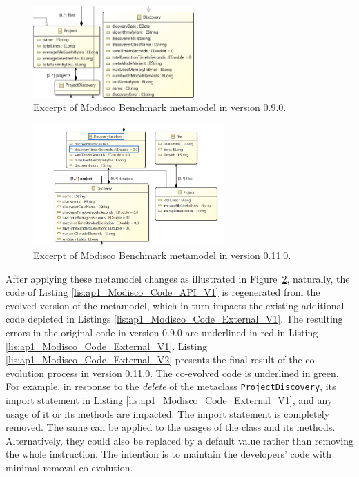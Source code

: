 \begin{figure}[t]
	
	\centering
	\includegraphics[width=0.55\textwidth]{./pics/chapter1pics/example.PNG}
	\caption{Excerpt of Modisco Benchmark metamodel in version 0.9.0.}
	\label{fig: BMM}
	\vspace{-5mm}
\end{figure}
\begin{figure}[t]
	
	\centering
	\includegraphics[width=0.65\textwidth]{./pics/chapter1pics/ExcerptModiscoV2.PNG}
	\caption{Excerpt of Modisco Benchmark metamodel in version 0.11.0.}
	\label{fig: BMMV2}
	\vspace{-5mm}
\end{figure}
After applying these metamodel changes as illustrated in Figure~\ref{fig: BMMV2}, naturally, the code of Listing \ref{lis:ap1_Modisco_Code_API_V1} is regenerated from the evolved version of the metamodel, which in turn impacts the existing additional code depicted in Listings \ref{lis:ap1_Modisco_Code_External_V1}. 
The resulting errors in the original code in version 0.9.0 are underlined in red in Listing \ref{lis:ap1_Modisco_Code_External_V1}. 
Listing \ref{lis:ap1_Modisco_Code_External_V2} presents the final result of the co-evolution process in version 0.11.0. The co-evolved code is underlined in green. 
For example, in response to the \textit{delete} of the metaclass \texttt{ProjectDiscovery}, its import statement {\small{}} in Listing \ref{lis:ap1_Modisco_Code_External_V1}, and any usage of it or its methods are impacted. The import statement is completely removed. The same can be applied to the usages of the class and its methods. Alternatively, they could also be replaced by a default value rather than removing the whole instruction. The intention is to maintain the developers' code with minimal removal co-evolution. 

